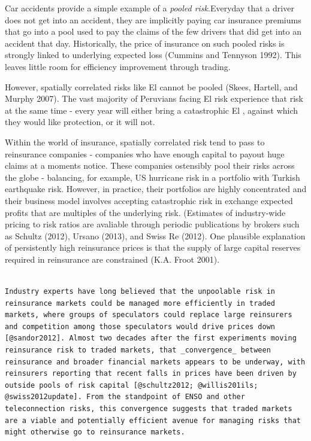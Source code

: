 \documentclass[article]{jss}
\begin{document}
Car accidents provide a simple example of a \emph{pooled risk}.Everyday
that a driver does not get into an accident, they are implicitly paying
car insurance premiums that go into a pool used to pay the claims of the
few drivers that did get into an accident that day. Historically, the
price of insurance on such pooled risks is strongly linked to underlying
expected loss (Cummins and Tennyson 1992). This leaves little room for
efficiency improvement through trading.

However, spatially correlated risks like El  cannot be
pooled (Skees, Hartell, and Murphy 2007). The vast majority of Peruvians
facing El  risk experience that risk at the same time -
every year will either bring a catastrophic El , against
which they would like protection, or it will not.

Within the world of insurance, spatially correlated risk tend to pass to
reinsurance companies - companies who have enough capital to payout huge
claims at a moments notice. These companies ostensibly pool their risks
across the globe - balancing, for example, US hurricane risk in a
portfolio with Turkish earthquake risk. However, in practice, their
portfolios are highly concentrated and their business model involves
accepting catastrophic risk in exchange expected profits that are
multiples of the underlying risk. (Estimates of industry-wide pricing to
risk ratios are avaliable through periodic publications by brokers such
as Schultz (2012), Ursano (2013), and Swiss Re (2012). One plausible
explanation of persistently high reinsurance prices is that the supply
of large capital reserves required in reinsurance are constrained (K.A.
Froot 2001).

\begin{verbatim}
                                                                                                                                                                                                                                                                                                                                                                                                                                                                                                                                      Industry experts have long believed that the unpoolable risk in reinsurance markets could be managed more efficiently in traded markets, where groups of speculators could replace large reinsurers and competition among those speculators would drive prices down [@sandor2012]. Almost two decades after the first experiments moving reinsurance risk to traded markets, that _convergence_ between reinsurance and broader financial markets appears to be underway, with reinsurers reporting that recent falls in prices have been driven by outside pools of risk capital [@schultz2012; @willis201ils; @swiss2012update]. From the standpoint of ENSO and other teleconnection risks, this convergence suggests that traded markets are a viable and potentially efficient avenue for managing risks that might otherwise go to reinsurance markets.
\end{verbatim}
\end{document}
